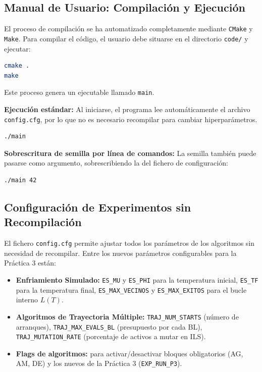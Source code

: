 \subsection{Manual de Usuario: Compilación y Ejecución}

El proceso de compilación se ha automatizado completamente mediante \texttt{CMake} y \texttt{Make}. Para compilar el código, el usuario debe situarse en el directorio \texttt{code/} y ejecutar:

\begin{lstlisting}[language=bash, frame=single]
cmake .
make
\end{lstlisting}

Este proceso genera un ejecutable llamado \texttt{main}.

\textbf{Ejecución estándar:} Al iniciarse, el programa lee automáticamente el archivo \texttt{config.cfg}, por lo que no es necesario recompilar para cambiar hiperparámetros.

\begin{lstlisting}[language=bash, frame=single]
./main
\end{lstlisting}

\textbf{Sobrescritura de semilla por línea de comandos:} La semilla también puede pasarse como argumento, sobrescribiendo la del fichero de configuración:

\begin{lstlisting}[language=bash, frame=single]
./main 42
\end{lstlisting}

\subsection{Configuración de Experimentos sin Recompilación}

El fichero \texttt{config.cfg} permite ajustar todos los parámetros de los algoritmos sin necesidad de recompilar. Entre los nuevos parámetros configurables para la Práctica 3 están:

\begin{itemize}[noitemsep]
    \item \textbf{Enfriamiento Simulado:} \texttt{ES\_MU} y \texttt{ES\_PHI} para la temperatura inicial, \texttt{ES\_TF} para la temperatura final, \texttt{ES\_MAX\_VECINOS} y \texttt{ES\_MAX\_EXITOS} para el bucle interno $L(T)$.
    \item \textbf{Algoritmos de Trayectoria Múltiple:} \texttt{TRAJ\_NUM\_STARTS} (número de arranques), \texttt{TRAJ\_MAX\_EVALS\_BL} (presupuesto por cada BL), \texttt{TRAJ\_MUTATION\_RATE} (porcentaje de activos a mutar en ILS).
    \item \textbf{Flags de algoritmos:} para activar/desactivar bloques obligatorios (AG, AM, DE) y los nuevos de la Práctica 3 (\texttt{EXP\_RUN\_P3}).
\end{itemize}

